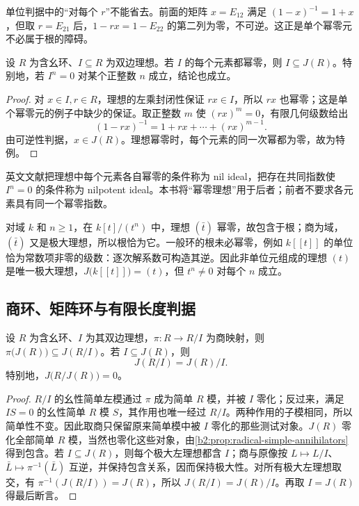 单位判据中的“对每个 \(r\)”不能省去。前面的矩阵 \(x=E_{12}\) 满足 \((1-x)^{-1}=1+x\)，但取 \(r=E_{21}\) 后，\(1-rx=1-E_{22}\) 的第二列为零，不可逆。这正是单个幂零元不必属于根的障碍。

\begin{corollary}\label{b2:cor:nil-ideal-radical}
	设 \(R\) 为含幺环、\(I\subseteq R\) 为双边理想。若 \(I\) 的每个元素都幂零，则 \(I\subseteq J(R)\)。特别地，若 \(I^n=0\) 对某个正整数 \(n\) 成立，结论也成立。
\end{corollary}
\begin{proof}
	对 \(x\in I,r\in R\)，理想的左乘封闭性保证 \(rx\in I\)，所以 \(rx\) 也幂零；这是单个幂零元的例子中缺少的保证。取正整数 \(m\) 使 \((rx)^m=0\)，有限几何级数给出
	\[
		(1-rx)^{-1}=1+rx+\cdots+(rx)^{m-1}.
	\]
	由可逆性判据，\(x\in J(R)\)。理想幂零时，每个元素的同一次幂都为零，故为特例。
\end{proof}

英文文献把理想中每个元素各自幂零的条件称为 nil ideal，把存在共同指数使 \(I^n=0\) 的条件称为 nilpotent ideal。本书将“幂零理想”用于后者；前者不要求各元素具有同一个幂零指数。

\ProseParagraphBreak
对域 \(k\) 和 \(n\ge1\)，在 \(k[t]/(t^n)\) 中，理想 \((\bar t)\) 幂零，故包含于根；商为域，\((\bar t)\) 又是极大理想，所以根恰为它。一般环的根未必幂零，例如 \(k[\![t]\!]\) 的单位恰为常数项非零的级数：逐次解系数可构造其逆。因此非单位元组成的理想 \((t)\) 是唯一极大理想，\(J\bigl(k[\![t]\!]\bigr)=(t)\)，但 \(t^n\ne0\) 对每个 \(n\) 成立。

\subsection{商环、矩阵环与有限长度判据}
\label{b2:subsec:1401:03}

\begin{proposition}\label{b2:prop:radical-quotient}
	设 \(R\) 为含幺环、\(I\) 为其双边理想，\(\pi:R\to R/I\) 为商映射，则 \(\pi\bigl(J(R)\bigr)\subseteq J(R/I)\)。若 \(I\subseteq J(R)\)，则
	\[
		J(R/I)=J(R)/I.
	\]
	特别地，\(J\bigl(R/J(R)\bigr)=0\)。
\end{proposition}
\begin{proof}
	\(R/I\) 的幺性简单左模通过 \(\pi\) 成为简单 \(R\) 模，并被 \(I\) 零化；反过来，满足 \(IS=0\) 的幺性简单 \(R\) 模 \(S\)，其作用也唯一经过 \(R/I\)。两种作用的子模相同，所以简单性不变。因此取商只保留原来简单模中被 \(I\) 零化的那些测试对象。\(J(R)\) 零化全部简单 \(R\) 模，当然也零化这些对象，由\cref{b2:prop:radical-simple-annihilators}得到包含。若 \(I\subseteq J(R)\)，则每个极大左理想都含 \(I\)；商与原像按 \(L\mapsto L/I\)、\(\bar L\mapsto\pi^{-1}(\bar L)\) 互逆，并保持包含关系，因而保持极大性。对所有极大左理想取交，有 \(\pi^{-1}(J(R/I))=J(R)\)，所以 \(J(R/I)=J(R)/I\)。再取 \(I=J(R)\) 得最后断言。
\end{proof}

